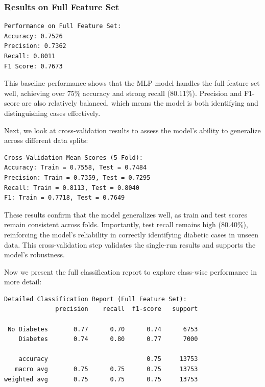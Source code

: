 \subsubsection{Results on Full Feature Set}

\begin{verbatim}
Performance on Full Feature Set:
Accuracy: 0.7526
Precision: 0.7362
Recall: 0.8011
F1 Score: 0.7673
\end{verbatim}

\noindent
This baseline performance shows that the MLP model handles the full feature set well, achieving over 75\% accuracy and strong recall (80.11\%). Precision and F1-score are also relatively balanced, which means the model is both identifying and distinguishing cases effectively.

\vspace{0.5em}
\noindent
Next, we look at cross-validation results to assess the model’s ability to generalize across different data splits:

\begin{verbatim}
Cross-Validation Mean Scores (5-Fold):
Accuracy: Train = 0.7558, Test = 0.7484
Precision: Train = 0.7359, Test = 0.7295
Recall: Train = 0.8113, Test = 0.8040
F1: Train = 0.7718, Test = 0.7649
\end{verbatim}

\noindent
These results confirm that the model generalizes well, as train and test scores remain consistent across folds. Importantly, test recall remains high (80.40\%), reinforcing the model’s reliability in correctly identifying diabetic cases in unseen data. This cross-validation step validates the single-run results and supports the model’s robustness.

\vspace{0.5em}
\noindent
Now we present the full classification report to explore class-wise performance in more detail:

\begin{verbatim}
Detailed Classification Report (Full Feature Set):
              precision    recall  f1-score   support

 No Diabetes       0.77      0.70      0.74      6753
    Diabetes       0.74      0.80      0.77      7000

    accuracy                           0.75     13753
   macro avg       0.75      0.75      0.75     13753
weighted avg       0.75      0.75      0.75     13753
\end{verbatim}

